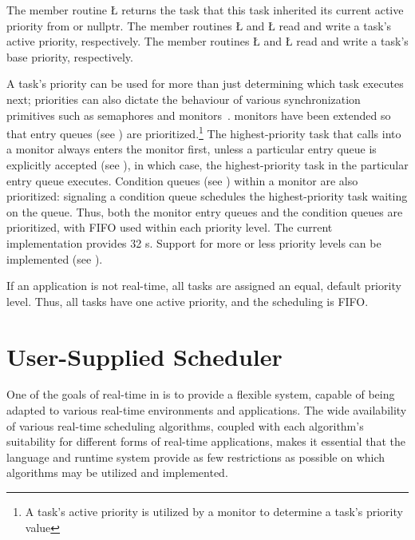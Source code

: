 \documentclass[openright,twoside]{report}
\begin{document}
\begin{sloppypar}
The member routine \LGinlinetrue\LGbegin\lgrinde\L{}\endlgrinde\LGend{} returns the task that this task inherited its current active priority from or nullptr.
The member routines \LGinlinetrue\LGbegin\lgrinde\L{}\endlgrinde\LGend{} and \LGinlinetrue\LGbegin\lgrinde\L{}\endlgrinde\LGend{} read and write a task's active priority, respectively.
The member routines \LGinlinetrue\LGbegin\lgrinde\L{}\endlgrinde\LGend{} and \LGinlinetrue\LGbegin\lgrinde\L{}\endlgrinde\LGend{} read and write a task's base priority, respectively.
\end{sloppypar}

A task's priority can be used for more than just determining which task executes next;
priorities can also dictate the behaviour of various synchronization primitives such as semaphores and monitors~\cite{Burns90}.
\uC monitors have been extended so that entry queues (see ) are prioritized.\footnote{A task's active priority is utilized by a \uC monitor to determine a task's priority value}
The highest-priority task that calls into a monitor always enters the monitor first, unless a particular entry queue is explicitly accepted (see ), in which case, the highest-priority task in the particular entry queue executes.
Condition queues (see ) within a monitor are also prioritized: signaling a condition queue schedules the highest-priority task waiting on the queue.
Thus, both the monitor entry queues and the condition queues are prioritized, with FIFO used within each priority level.
The current implementation provides 32 s.
Support for more or less priority levels can be implemented (see ).

If an application is not real-time, all tasks are assigned an equal, default priority level.
Thus, all tasks have one active priority, and the scheduling is FIFO.


\section{User-Supplied Scheduler}
\label{s:UserSuppliedScheduler}

One of the goals of real-time in \uC is to provide a flexible system, capable of being adapted to various real-time environments and applications.
The wide availability of various real-time scheduling algorithms, coupled with each algorithm's suitability for different forms of real-time applications, makes it essential that the language and runtime system provide as few restrictions as possible on which algorithms may be utilized and implemented.
\end{document}
